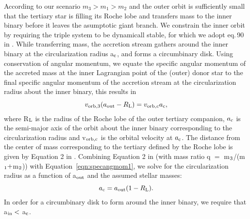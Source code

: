 \documentclass{aastex62}
\begin{document}
According to our scenario $m_3 > m_1 > m_2$ and the outer orbit is
sufficiently small that the tertiary star is filling its Roche lobe
and transfers mass to the inner binary before it leaves the asumptotic
giant branch. We constrain the inner orbit by requiring the triple
system to be dynamicall stable, for which we adopt eq.\,90 in
\cite{2001MNRAS.321..398M}.  While transferring mass, the accretion
stream gathers around the inner binary at the circularization radius
a$_{\rm c}$, and forms a circumbinary disk.  Using conservation of
angular momentum, we equate the specific angular momentum of the
accreted mass at the inner Lagrangian point of the (outer) donor star
to the final specific angular momentum of the accretion stream at the
circularization radius about the inner binary, this results in
\begin{equation}
\label{eqn:specangmom1}
v_{\rm orb,3}(a_{\rm out} - R_{\rm L}) = v_{\rm orb,c}a_{\rm c},
\end{equation}
where R$_{\rm L}$ is the radius of the Roche lobe of the outer
tertiary companion, $a_{\rm c}$ is the semi-major axis of the orbit
about the inner binary corresponding to the circularization radius and
v$_{\rm orb,c}$ is the orbital velocity at $a_{\rm c}$.  The distance
from the center of mass corresponding to the tertiary defined by the
Roche lobe is given by Equation 2 in \citep{1983ApJ...268..368E}.
Combining Equation 2 in \citet{1983ApJ...268..368E} (with mass ratio q
$=$ m$_{\rm 3}$/(m$_{\rm 1} +$m$_{\rm 2}$)) with
Equation~\ref{eqn:specangmom1}, we solve for the circularization
radius as a function of a$_{\rm out}$ and the assumed stellar masses:
\begin{equation}
\label{eqn:ac}
a_{\rm c} = a_{\rm out}(1 - R_{\rm L}).
\end{equation}
In order for a circumbinary disk to form around the inner binary, we
require that a$_{\rm in} <$ a$_{\rm c}$.
\end{document}
